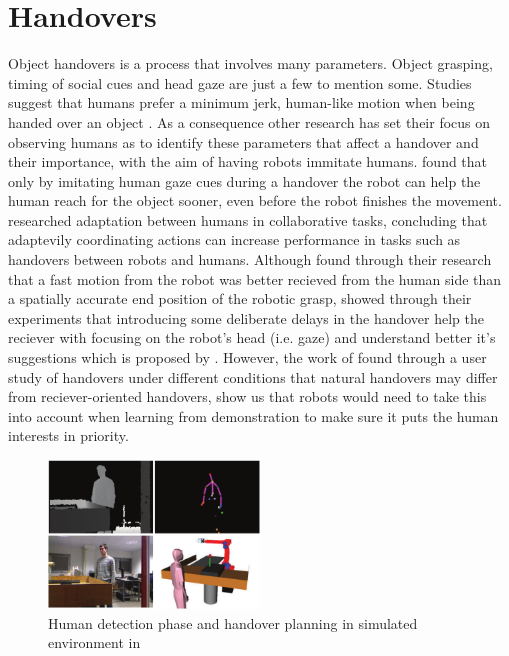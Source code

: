 \section{Handovers}
Object handovers is a process that involves many parameters. Object grasping, timing of social cues and head gaze are just a few to mention some. Studies suggest that humans prefer a minimum jerk, human-like motion when being handed over an object \parencite{Huber2008} \parencite{Huber2008a}. As a consequence other research has set their focus on observing humans as to identify these parameters that affect a handover and their importance, with the aim of having robots immitate humans. \textcite{Moon2014} found that only by imitating human gaze cues during a handover the robot can help the human reach for the object sooner, even before the robot finishes the movement. \textcite{Huang2015} researched adaptation between humans in collaborative tasks, concluding that adaptevily coordinating actions can increase performance in tasks such as handovers between robots and humans. Although \textcite{Koene2014} found through their research that a fast motion from the robot was better recieved from the human side than a spatially accurate end position of the robotic grasp, \textcite{Admoni2014} showed through their experiments that introducing some deliberate delays in the handover help the reciever with focusing on the robot's head (i.e. gaze) and understand better it's suggestions which is proposed by \parencite{Moon2014}. However, the work of \textcite{Chan2015} found through a user study of handovers under different conditions that natural handovers may differ from reciever-oriented handovers, show us that robots would need to take this into account when learning from demonstration to make sure it puts the human interests in priority.

\begin{figure}
	\centering
	\includegraphics[width=0.5\textwidth]{img/related-work/planning-simulation.png}
	\caption{Human detection phase and handover planning in simulated environment in \parencite{Aleotti2012}}
\end{figure}

